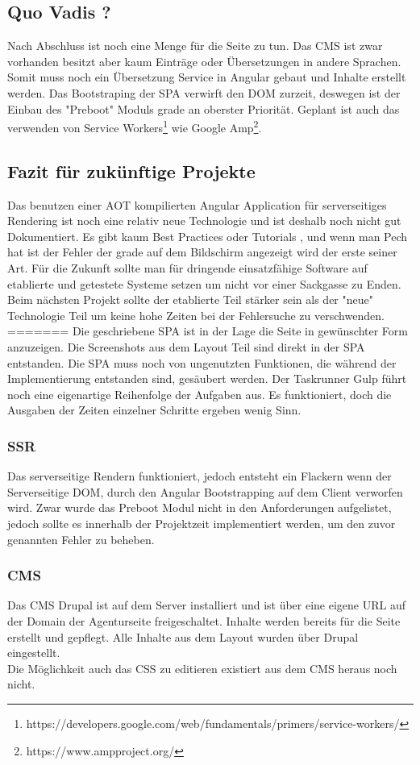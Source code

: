 \documentclass[11pt,a4paper]{article}
\begin{document}
\subsection{Quo Vadis ?}
Nach Abschluss ist noch eine Menge für die Seite zu tun.
Das CMS  ist zwar vorhanden besitzt aber kaum Einträge oder Übersetzungen in andere Sprachen.
Somit muss noch ein Übersetzung Service in Angular gebaut und Inhalte erstellt werden. Das Bootstraping der SPA verwirft den DOM zurzeit, deswegen ist der Einbau des "Preboot" Moduls grade an oberster Priorität. Geplant ist auch das verwenden von Service Workers\footnote{https://developers.google.com/web/fundamentals/primers/service-workers/} wie Google Amp\footnote{https://www.ampproject.org/}.
\subsection{Fazit für zukünftige Projekte}
Das benutzen einer AOT kompilierten Angular Application für serverseitiges Rendering ist noch eine relativ neue Technologie und ist deshalb noch nicht gut Dokumentiert. Es gibt kaum Best Practices oder Tutorials , und wenn man Pech hat ist der Fehler der grade auf dem Bildschirm angezeigt wird der erste seiner Art. Für die Zukunft sollte man für dringende einsatzfähige Software auf etablierte und getestete Systeme setzen um nicht vor einer Sackgasse zu Enden. Beim nächsten Projekt sollte der etablierte Teil stärker sein als der "neue" Technologie Teil um keine hohe Zeiten bei der Fehlersuche  zu verschwenden.
=======
Die geschriebene SPA ist in der Lage die Seite in gewünschter Form anzuzeigen. Die Screenshots aus dem Layout Teil sind direkt in der SPA entstanden. Die SPA muss noch von ungenutzten Funktionen, die während der Implementierung entstanden sind, gesäubert werden. Der Taskrunner Gulp führt noch eine eigenartige Reihenfolge der Aufgaben aus. Es funktioniert, doch die Ausgaben der Zeiten einzelner Schritte ergeben wenig Sinn.
\subsubsection{SSR}
Das serverseitige Rendern funktioniert, jedoch entsteht ein Flackern wenn der Serverseitige DOM, durch den Angular Bootstrapping auf dem Client verworfen wird. Zwar wurde das Preboot Modul nicht in den Anforderungen aufgelistet, jedoch sollte es innerhalb der Projektzeit implementiert werden, um den zuvor genannten Fehler zu beheben.
\subsubsection{CMS}
Das \acs{CMS} Drupal ist auf dem Server installiert und ist über eine eigene URL auf der Domain der Agenturseite freigeschaltet. Inhalte werden bereits für die Seite erstellt und gepflegt. Alle Inhalte aus dem Layout wurden über Drupal eingestellt.\\
Die Möglichkeit auch das CSS zu editieren existiert aus dem CMS heraus noch nicht. 
\end{document}
